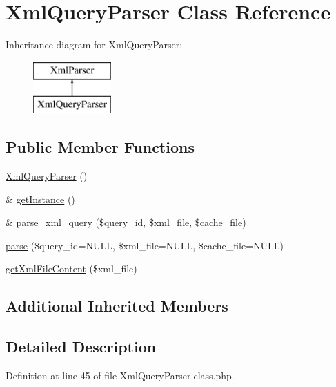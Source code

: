 \hypertarget{classXmlQueryParser}{}\section{Xml\+Query\+Parser Class Reference}
\label{classXmlQueryParser}
Inheritance diagram for Xml\+Query\+Parser\+:\begin{figure}[H]
\begin{center}
\leavevmode
\includegraphics[height=2.000000cm]{classXmlQueryParser}
\end{center}
\end{figure}
\subsection*{Public Member Functions}
\begin{DoxyCompactItemize}
\item 
\hyperlink{classXmlQueryParser_ac90d36a02cc74ea88d162d6fa0a44e21}{Xml\+Query\+Parser} ()
\item 
\& \hyperlink{classXmlQueryParser_af6558a14a48242f4082d4b05e24b66be}{get\+Instance} ()
\item 
\& \hyperlink{classXmlQueryParser_ada0b24aac541d493f8344a74776664cb}{parse\+\_\+xml\+\_\+query} (\$query\+\_\+id, \$xml\+\_\+file, \$cache\+\_\+file)
\item 
\hyperlink{classXmlQueryParser_a73bf00a88a856f3acb99dba3f554aeb2}{parse} (\$query\+\_\+id=N\+U\+L\+L, \$xml\+\_\+file=N\+U\+L\+L, \$cache\+\_\+file=N\+U\+L\+L)
\item 
\hyperlink{classXmlQueryParser_aed43fc81b117c0d90948cb70cdad6280}{get\+Xml\+File\+Content} (\$xml\+\_\+file)
\end{DoxyCompactItemize}
\subsection*{Additional Inherited Members}


\subsection{Detailed Description}


Definition at line 45 of file Xml\+Query\+Parser.\+class.\+php.



